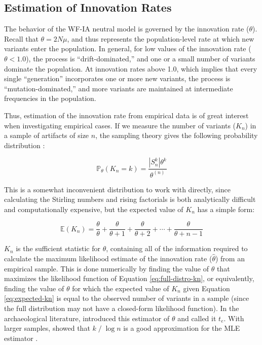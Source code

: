 \subsection{Estimation of Innovation Rates}
\label{sec:theta-estimation-theory}

The behavior of the WF-IA neutral model is governed by the innovation rate ($\theta$).  Recall that $\theta = 2 N \mu$, and thus represents the population-level rate at which new variants enter the population.  In general, for low values of the innovation rate ($\theta < 1.0$), the process is ``drift-dominated,'' and one or a small number of variants dominate the population.  At innovation rates above 1.0, which implies that every single ``generation'' incorporates one or more new variants, the process is ``mutation-dominated,'' and more variants are maintained at intermediate frequencies in the population.  

Thus, estimation of the innovation rate from empirical data is of great interest when investigating empirical cases.   If we measure the number of variants ($K_n$) in a sample of artifacts of size $n$, the sampling theory  gives the following probability distribution \citep[Eq. 3.84]{Ewens2004}:

\begin{equation} 
\label{eq:full-distro-kn}
	\mathbb{P}_{\theta}(K_n = k) = \frac{|S^k_n| \theta^k}{\theta^{(n)}}
\end{equation}

This is a somewhat inconvenient distribution to work with directly, since calculating the Stirling numbers and rising factorials is both analytically difficult and computationally expensive, but the expected value of $K_n$ has a simple form:

\begin{equation} 
\label{eq:expected-kn}
	\mathbb{E}(K_n) = \frac{\theta}{\theta} + \frac{\theta}{\theta + 1} + \frac{\theta}{\theta + 2} + \cdots + \frac{\theta}{\theta + n - 1}
\end{equation}

$K_n$ is the sufficient statistic for $\theta$, containing all of the information required to calculate the maximum likelihood estimate of the innovation rate ($\hat{\theta}$) from an empirical sample.  This is done numerically by finding the value of $\theta$ that maximizes the likelihood function of Equation \ref{eq:full-distro-kn}, or equivalently, finding the value of $\theta$ for which the expected value of $K_n$ given Equation \ref{eq:expected-kn} is equal to the observed number of variants in a sample (since the full distribution may not have a closed-form likelihood function).  In the archaeological literature, \citet{Neiman1995} introduced this estimator of $\theta$ and called it $t_e$.  With larger samples, \citet{watterson1975number} showed that $k\;/\;\log n$ is a good approximation for the MLE estimator \citep{durrett2008}.  

